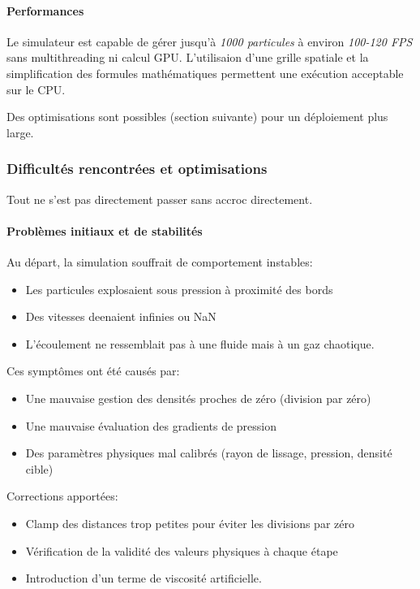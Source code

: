 \documentclass{article}
\begin{document}
\paragraph{Performances}

Le simulateur est capable de gérer jusqu'à {\emph {1000 particules}} à environ {\emph {100-120 FPS}} sans multithreading ni calcul GPU. L'utilisaion d'une grille spatiale et la simplification des formules mathématiques permettent une exécution acceptable sur le CPU.

Des optimisations sont possibles (section suivante) pour un déploiement plus large.

\subsubsection{Difficultés rencontrées et optimisations}

Tout ne s'est pas directement passer sans accroc directement.

\paragraph{Problèmes initiaux et de stabilités}

Au départ, la simulation souffrait de comportement instables:

\begin{itemize}
    \item Les particules explosaient sous pression à proximité des bords
    \item Des vitesses deenaient infinies ou NaN
    \item L'écoulement ne ressemblait pas à une fluide mais à un gaz chaotique.
\end{itemize}

Ces symptômes ont été causés par:

\begin{itemize}
    \item Une mauvaise gestion des densités proches de zéro (division par zéro)
    \item Une mauvaise évaluation des gradients de pression
    \item Des paramètres physiques mal calibrés (rayon de lissage, pression, densité cible)
\end{itemize}

Corrections apportées:

\begin{itemize}
    \item Clamp des distances trop petites pour éviter les divisions par zéro
    \item Vérification de la validité des valeurs physiques à chaque étape
    \item Introduction d’un terme de viscosité artificielle.
\end{itemize}
\end{document}
